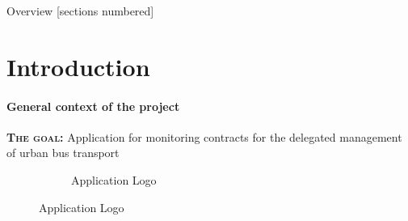 \titleframe

\begin{frame}{Overview}
  [sections numbered]
  \tableofcontents[hideallsubsections]
\end{frame}


\section{Introduction}
\begin{frame}{\insertsectionhead}
  \framesubtitle{General context of the project}
\textbf{\textsc{The goal:}}\xspace Application for monitoring contracts for the delegated management of urban bus transport
\begin{figure}[ht!]
  \hspace{\fill}
  \begin{subfigure}[b]{0.3\textwidth}
    \caption*{Application Logo}
  \end{subfigure}
  \hspace{\fill}
\end{figure}
\end{frame}


